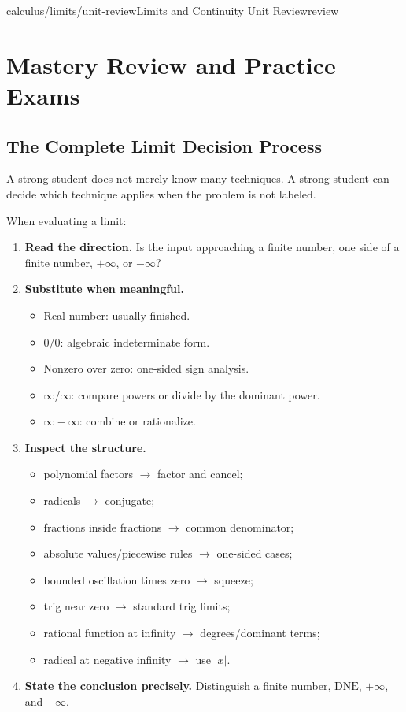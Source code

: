 \documentclass[11pt,openany]{book}
\theoremstyle{bgplain}
\newcommand{\DNE}{\mathrm{DNE}}
\begin{document}
\begin{webpage}{calculus/limits/unit-review}{Limits and Continuity Unit Review}{review}
\chapter{Mastery Review and Practice Exams}

\section{The Complete Limit Decision Process}

A strong student does not merely know many techniques. A strong student can decide which technique applies when the problem is not labeled.

\begin{bgmethod}[title={Master Decision Tree}]
When evaluating a limit:
\begin{enumerate}
  \item \textbf{Read the direction.} Is the input approaching a finite number, one side of a finite number, \(+\infty\), or \(-\infty\)?
  \item \textbf{Substitute when meaningful.}
  \begin{itemize}
    \item Real number: usually finished.
    \item \(0/0\): algebraic indeterminate form.
    \item Nonzero over zero: one-sided sign analysis.
    \item \(\infty/\infty\): compare powers or divide by the dominant power.
    \item \(\infty-\infty\): combine or rationalize.
  \end{itemize}
  \item \textbf{Inspect the structure.}
  \begin{itemize}
    \item polynomial factors \(\to\) factor and cancel;
    \item radicals \(\to\) conjugate;
    \item fractions inside fractions \(\to\) common denominator;
    \item absolute values/piecewise rules \(\to\) one-sided cases;
    \item bounded oscillation times zero \(\to\) squeeze;
    \item trig near zero \(\to\) standard trig limits;
    \item rational function at infinity \(\to\) degrees/dominant terms;
    \item radical at negative infinity \(\to\) use \(|x|\).
  \end{itemize}
  \item \textbf{State the conclusion precisely.} Distinguish a finite number, \(\DNE\), \(+\infty\), and \(-\infty\).
\end{enumerate}
\end{bgmethod}
\end{webpage}
\end{document}
